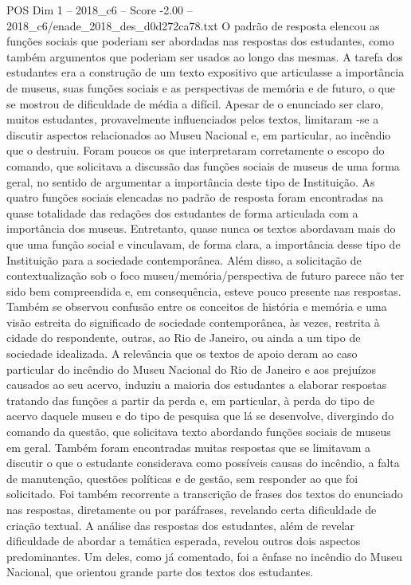 \begin{textsample}{POS Dim 1 – 2018\_c6 – Score -2.00 – 2018\_c6/enade\_2018\_des\_d0d272ca78.txt}
O padrão de resposta elencou as funções sociais que poderiam ser abordadas nas respostas dos estudantes, como também argumentos que poderiam ser usados ao longo das mesmas.
A tarefa dos estudantes era a construção de um texto expositivo que articulasse a importância de museus, suas funções sociais e as perspectivas de memória e de futuro, o que se mostrou de dificuldade de média a difícil.
Apesar de o enunciado ser claro, muitos estudantes, provavelmente influenciados pelos textos, limitaram -se a discutir aspectos relacionados ao Museu Nacional e, em particular, ao incêndio que o destruiu.
Foram poucos os que interpretaram corretamente o escopo do comando, que solicitava a discussão das funções sociais de museus de uma forma geral, no sentido de argumentar a importância deste tipo de Instituição.
As quatro funções sociais elencadas no padrão de resposta foram encontradas na quase totalidade das redações dos estudantes de forma articulada com a importância dos museus.
Entretanto, quase nunca os textos abordavam mais do que uma função social e vinculavam, de forma clara, a importância desse tipo de Instituição para a sociedade contemporânea.
Além disso, a solicitação de contextualização sob o foco museu/memória/perspectiva de futuro parece não ter sido bem compreendida e, em consequência, esteve pouco presente nas respostas.
Também se observou confusão entre os conceitos de história e memória e uma visão estreita do significado de sociedade contemporânea, às vezes, restrita à cidade do respondente, outras, ao Rio de Janeiro, ou ainda a um tipo de sociedade idealizada.
A relevância que os textos de apoio deram ao caso particular do incêndio do Museu Nacional do Rio de Janeiro e aos prejuízos causados ao seu acervo, induziu a maioria dos estudantes a elaborar respostas tratando das funções a partir da perda e, em particular, à perda do tipo de acervo daquele museu e do tipo de pesquisa que lá se desenvolve, divergindo do comando da questão, que solicitava texto abordando funções sociais de museus em geral.
Também foram encontradas muitas respostas que se limitavam a discutir o que o estudante considerava como possíveis causas do incêndio, a falta de manutenção, questões políticas e de gestão, sem responder ao que foi solicitado.
Foi também recorrente a transcrição de frases dos textos do enunciado nas respostas, diretamente ou por paráfrases, revelando certa dificuldade de criação textual.
A análise das respostas dos estudantes, além de revelar dificuldade de abordar a temática esperada, revelou outros dois aspectos predominantes.
Um deles, como já comentado, foi a ênfase no incêndio do Museu Nacional, que orientou grande parte dos textos dos estudantes.

\end{textsample}
